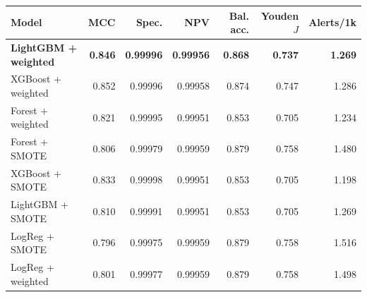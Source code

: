 \begin{tabular}{l r r r r r r}
\hline
\textbf{Model} & \textbf{MCC} & \textbf{Spec.} & \textbf{NPV} & \textbf{Bal. acc.} & \textbf{Youden $J$} & \textbf{Alerts/1k} \\
\hline
\textbf{LightGBM + weighted} & \textbf{0.846} & \textbf{0.99996} & \textbf{0.99956} & \textbf{0.868} & \textbf{0.737} & \textbf{1.269} \\
XGBoost + weighted & 0.852 & 0.99996 & 0.99958 & 0.874 & 0.747 & 1.286 \\
Forest + weighted & 0.821 & 0.99995 & 0.99951 & 0.853 & 0.705 & 1.234 \\
Forest + SMOTE & 0.806 & 0.99979 & 0.99959 & 0.879 & 0.758 & 1.480 \\
XGBoost + SMOTE & 0.833 & 0.99998 & 0.99951 & 0.853 & 0.705 & 1.198 \\
LightGBM + SMOTE & 0.810 & 0.99991 & 0.99951 & 0.853 & 0.705 & 1.269 \\
LogReg + SMOTE & 0.796 & 0.99975 & 0.99959 & 0.879 & 0.758 & 1.516 \\
LogReg + weighted & 0.801 & 0.99977 & 0.99959 & 0.879 & 0.758 & 1.498 \\
\hline
\end{tabular}